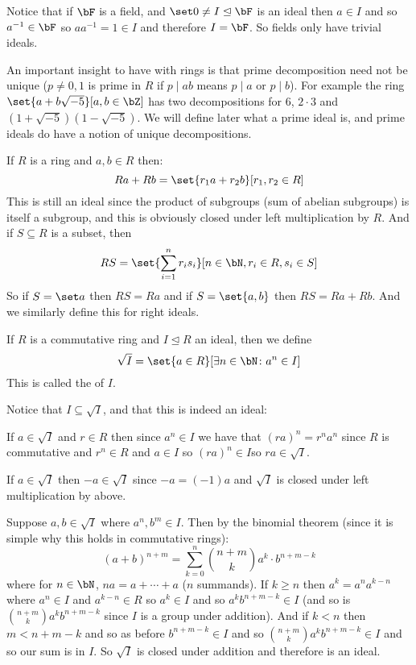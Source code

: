 \documentclass[10pt]{article}
\let\divides=\mid
\let\ideal=\trianglelefteq
\begin{document}
Notice that if $\bF$ is a field, and $\set0\neq I\ideal\bF$ is an ideal then $a\in I$ and so $a^{-1}\in\bF$ so $aa^{-1}=1\in I$ and therefore $I=\bF$.
So fields only have trivial ideals.

An important insight to have with rings is that prime decomposition need not be unique ($p\neq0,1$ is prime in $R$ if $p\divides ab$ means $p\divides a$ or $p\divides b$).
For example the ring $\set{a+b\sqrt{-5}}[a,b\in\bZ]$ has two decompositions for $6$, $2\cdot3$ and $(1+\sqrt{-5})(1-\sqrt{-5})$.
We will define later what a prime ideal is, and prime ideals do have a notion of unique decompositions.

\begin{defn*}

    If $R$ is a ring and $a,b\in R$ then:
    \[ Ra + Rb = \set{r_1a+r_2b}[r_1,r_2\in R] \]
    This is still an ideal since the product of subgroups (sum of abelian subgroups) is itself a subgroup, and this is obviously closed under left multiplication by $R$.
    And if $S\subseteq R$ is a subset, then
    \[ RS = \set{\sum_{i=1}^n r_is_i}[n\in\bN, r_i\in R, s_i\in S] \]
    So if $S=\set a$ then $RS=Ra$ and if $S=\set{a,b}$ then $RS=Ra+Rb$.
    And we similarly define this for right ideals.

\end{defn*}

\begin{defn*}

    If $R$ is a commutative ring and $I\ideal R$ an ideal, then we define
    \[ \sqrt I = \set{a\in R}[\exists n\in\bN\colon a^n\in I] \]
    This is called the  of $I$.

\end{defn*}

Notice that $I\subseteq\sqrt I$, and that this is indeed an ideal:
\benum
    \item If $a\in\sqrt I$ and $r\in R$ then since $a^n\in I$ we have that $(ra)^n=r^na^n$ since $R$ is commutative and $r^n\in R$ and $a\in I$ so $(ra)^n\in I$so $ra\in\sqrt I$.
    \item If $a\in\sqrt I$ then $-a\in\sqrt I$ since $-a=(-1)a$ and $\sqrt I$ is closed under left multiplication by above.
    \item Suppose $a,b\in\sqrt I$ where $a^n,b^m\in I$.
    Then by the binomial theorem (since it is simple why this holds in commutative rings):
    \[ (a+b)^{n+m} = \sum_{k=0}^n\binom{n+m}ka^k\cdot b^{n+m-k} \]
    where for $n\in\bN$, $na=a+\cdots+a$ ($n$ summands).
    If $k\geq n$ then $a^k=a^na^{k-n}$ where $a^n\in I$ and $a^{k-n}\in R$ so $a^k\in I$ and so $a^kb^{n+m-k}\in I$ (and so is $\binom{n+m}k a^kb^{n+m-k}$ since $I$ is a group under addition).
    And if $k<n$ then $m<n+m-k$ and so as before $b^{n+m-k}\in I$ and so $\binom{n+m}k a^kb^{n+m-k}\in I$ and so our sum is in $I$.
    So $\sqrt I$ is closed under addition and therefore is an ideal.
\eenum
\end{document}
